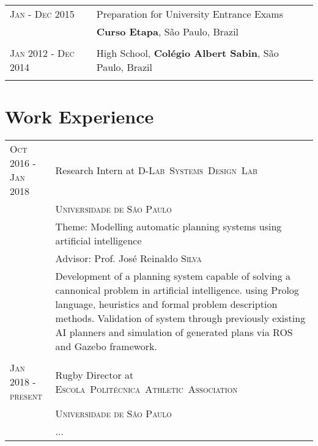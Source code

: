 \documentclass[a4paper,10pt]{article}
\begin{document}
{\begin{tabular}{R{3.5cm} p{10cm}}
\textsc{Jan - Dec 2015} & Preparation for University Entrance Exams\\& \textbf{Curso Etapa}, São Paulo, Brazil\\

&\\

\textsc{Jan 2012 - Dec 2014} & High School, \textbf{Colégio Albert Sabin}, São Paulo, Brazil\\

&\\

\end{tabular}


\section{Work Experience}

\vspace*{3pt}
\hspace*{-12pt}
\begin{tabular}{R{3.5cm} p{10cm}}



\textsc{Oct 2016 - Jan 2018} & Research Intern at \textsc{\mbox{D-Lab Systems Design Lab}} \\&
\textsc{Universidade de São Paulo}\\ & Theme: Modelling automatic planning systems using artificial intelligence  \\&
\small Advisor: Prof. José Reinaldo \textsc{Silva}\\& \footnotesize{ Development of a planning system capable of solving
a cannonical problem in artificial intelligence. using Prolog language, heuristics and formal problem description methods. Validation of
system through previously existing AI planners and simulation of generated plans via ROS and Gazebo framework.} \\
 \\

\textsc{Jan 2018 - present} & Rugby Director at \textsc{\mbox{Escola Politécnica Athletic Association}} \\&
\textsc{Universidade de São Paulo} \\& \footnotesize { ... }




\end{tabular}}
\end{document}
